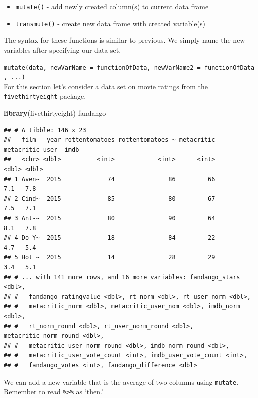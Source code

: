 \documentclass[
]{book}
\newenvironment{Shaded}{\begin{snugshade}}{\end{snugshade}}
\newcommand{\DataTypeTok}[1]{\textcolor[rgb]{0.13,0.29,0.53}{#1}}
\newcommand{\DecValTok}[1]{\textcolor[rgb]{0.00,0.00,0.81}{#1}}
\newcommand{\KeywordTok}[1]{\textcolor[rgb]{0.13,0.29,0.53}{\textbf{#1}}}
\newcommand{\NormalTok}[1]{#1}
\newcommand{\OperatorTok}[1]{\textcolor[rgb]{0.81,0.36,0.00}{\textbf{#1}}}
\newcommand{\StringTok}[1]{\textcolor[rgb]{0.31,0.60,0.02}{#1}}
\theoremstyle{definition}
\theoremstyle{definition}
\theoremstyle{definition}
\theoremstyle{remark}
\begin{document}
\begin{itemize}
\item
  \texttt{mutate()} - add newly created column(s) to current data frame
\item
  \texttt{transmute()} - create new data frame with created variable(s)
\end{itemize}

The syntax for these functions is similar to previous. We simply name the new variables after specifying our data set.

\texttt{mutate(data,\ newVarName\ =\ functionOfData,\ newVarName2\ =\ functionOfData,\ ...)}\\
For this section let's consider a data set on movie ratings from the \texttt{fivethirtyeight} package.

\begin{Shaded}
\begin{Highlighting}[]
\KeywordTok{library}\NormalTok{(fivethirtyeight)}
\NormalTok{fandango}
\end{Highlighting}
\end{Shaded}

\begin{verbatim}
## # A tibble: 146 x 23
##   film   year rottentomatoes rottentomatoes_~ metacritic metacritic_user  imdb
##   <chr> <dbl>          <int>            <int>      <int>           <dbl> <dbl>
## 1 Aven~  2015             74               86         66             7.1   7.8
## 2 Cind~  2015             85               80         67             7.5   7.1
## 3 Ant-~  2015             80               90         64             8.1   7.8
## 4 Do Y~  2015             18               84         22             4.7   5.4
## 5 Hot ~  2015             14               28         29             3.4   5.1
## # ... with 141 more rows, and 16 more variables: fandango_stars <dbl>,
## #   fandango_ratingvalue <dbl>, rt_norm <dbl>, rt_user_norm <dbl>,
## #   metacritic_norm <dbl>, metacritic_user_nom <dbl>, imdb_norm <dbl>,
## #   rt_norm_round <dbl>, rt_user_norm_round <dbl>, metacritic_norm_round <dbl>,
## #   metacritic_user_norm_round <dbl>, imdb_norm_round <dbl>,
## #   metacritic_user_vote_count <int>, imdb_user_vote_count <int>,
## #   fandango_votes <int>, fandango_difference <dbl>
\end{verbatim}

We can add a new variable that is the average of two columns using \texttt{mutate}. Remember to read \texttt{\%\textgreater{}\%} as `then.'

\begin{Shaded}
\end{Shaded}
\end{document}
